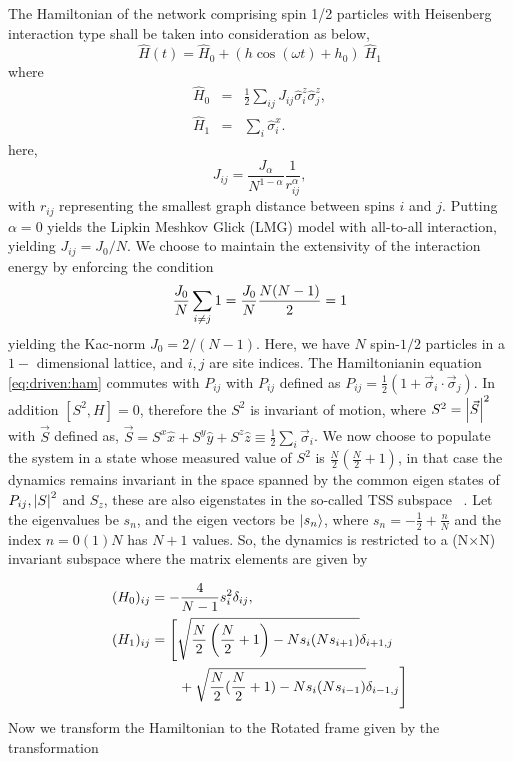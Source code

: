 \documentclass[%
reprint,
superscriptaddress,
amsmath,amssymb,
aps,
prb,
showkeys,
]{revtex4-2}
\begin{document}
	The Hamiltonian of the network comprising spin 1/2 particles with Heisenberg interaction type shall be taken into consideration as below,
	\begin{equation}
	\hat{H}(t) = \hat{H}_0 + \left(h \cos{(\omega t)} + h_0\right)\; \hat{H}_1
	\label{eq:driven:ham}
	\end{equation}
	where
	\begin{eqnarray}
		\label{eq:curieweiss:ham}
		\hat{H}_0 &=& \frac12 \sum_{ij}J_{ij}\hat{\sigma}^z_i\hat{\sigma}^z_j,\\
		\hat{H}_1 &=& \sum_i\hat{\sigma}^x_i.\nonumber
	\end{eqnarray}
	here,
	\begin{equation}
		\label{eq:jij}
		J_{ij} =\frac{J_\alpha}{N^{1-\alpha}}\frac{1}{r_{ij}^{\alpha}},
	\end{equation}
	with $r_{ij}$ representing the smallest graph distance between spins $i$ and $j$.
	Putting  $\alpha = 0$ yields the Lipkin Meshkov Glick (LMG) model with all-to-all interaction, yielding $J_{ij} = J_0/N$. We choose to maintain the extensivity of the interaction energy by enforcing the condition
	\begin{equation*}
		\frac{J_0}{N} \sum_{i\neq j}1=\frac{J_0}{N}\frac{N(N-1)}{2}=1\\
	\end{equation*}
	yielding the Kac-norm $J_0=2/(N-1)$. Here, we have $N$ spin-$1/2$ particles in a $1-$ dimensional lattice, and $i,j$ are site indices. The Hamiltonianin equation \ref{eq:driven:ham} commutes with $P_{ij}$  with $P_{ij}$ defined as $P_{ij} = \displaystyle\frac{1}{2}(1+ \vec{\sigma}_i\cdot\vec{\sigma}_j)$. In addition $[S^2, H]=0$, therefore the $S^2$ is invariant of motion, where $S^2=\abs{\vec{S}}^2$ with $\vec{S}$ defined as, $ \vec{S}=S^x\hat{x}+S^y\hat{y}+S^z\hat{z}\equiv\frac12 \sum_i \vec{\sigma}_i$. We now choose to populate the system in a state whose  measured value of $S^2$ is $\displaystyle\frac{N}{2}\left(\frac{N}{2}+1\right)$, in that case the dynamics remains invariant in the space spanned by the common eigen states of $P_{ij}, \abs{S}^2$ and $S_z$, these are also eigenstates in the so-called TSS subspace ~\cite{mori_prethermalization_2019}. Let the eigenvalues be $s_n$, and the eigen vectors be $\ket{s_n}$, where $s_n=-\frac{1}{2}+\frac{n}{N}$ and the index
	$n= 0 (1) N$ has $N+1$ values. So, the dynamics is restricted to a (N$\times$N) invariant subspace where the matrix elements are given by 
	
	\begin{align}
		(H_0)_{ij} &= -\frac{4}{N-1} s^2_i \delta_{ij},\nonumber\\
		(H_1)_{ij} &= \Bigg[\sqrt{\frac{N}{2}\left(\frac{N}{2}+1\right) - Ns_i(Ns_{i + 1})}\delta_{i+1, j} \nonumber\\ 
		&\hskip 0.7cm +\sqrt{\frac{N}{2}(\frac{N}{2}+1) - Ns_i(Ns_{i- 1})}\delta_{i-1,j}\Bigg]
		\label{eq:lmg:tssham}
	\end{align}
	Now we transform the Hamiltonian to the Rotated frame given by the transformation
	
\end{document}
